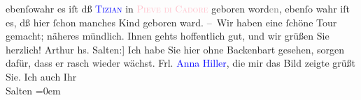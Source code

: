                     ebenſowahr es iſt dß \textcolor{blue}{\textsc{Tizian}}{}\ledrightnote{\textcolor{blue}{Tizian}} in \textcolor{pink}{\textsc{Pieve di Cadore}}{}\ledrightnote{\textcolor{pink}{Pieve di Cadore}} geboren word\textcolor{gray}{en}, ebenſo wahr iſt es, dß hier ſchon manches Kind
                    geboren ward.\pend
           \pstart
           – Wir haben eine ſchöne Tour gemacht; näheres mündlich. Ihnen gehts hoffentlich
                    gut, und wir grüßen Sie herzlich!\pend
           \pstart \spacefill\mbox{Arthur}\pend{}\pstart
           \noindent{}{[}hs. Salten:{]} Ich habe Sie hier ohne Backenbart gesehen, sorgen
                    dafür, dass er rasch wieder wächst. Frl. \textcolor{blue}{Anna
                        Hiller}{}\ledrightnote{\textcolor{blue}{Anna Kupelwieser}}, die mir das Bild zeigte grüßt Sie. Ich auch\pend
           \pstart
           Ihr{\\[\baselineskip]}\spacefill\mbox{Salten}\pend
           \leftskip=0em{}\endnumbering{}  
      